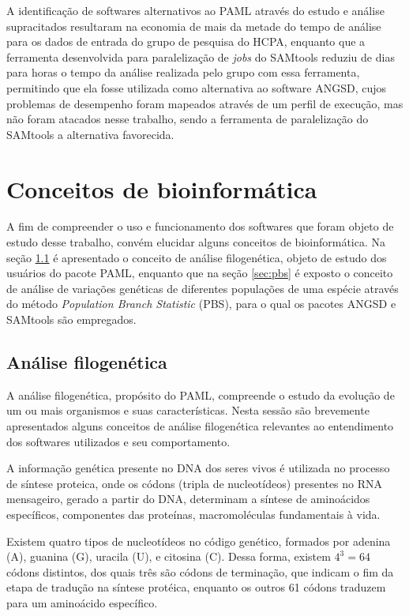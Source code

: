 \documentclass[cic,tc]{iiufrgs}
\begin{document}
A identificação de softwares alternativos ao PAML através do estudo e análise
supracitados resultaram na economia de mais da metade do tempo de análise para
os dados de entrada do grupo de pesquisa do HCPA, enquanto que a ferramenta
desenvolvida para paralelização de \textit{jobs} do SAMtools reduziu de dias
para horas o tempo da análise realizada pelo grupo com essa ferramenta,
permitindo que ela fosse utilizada como alternativa ao software ANGSD, cujos
problemas de desempenho foram mapeados através de um perfil de execução, mas
não foram atacados nesse trabalho, sendo a ferramenta de paralelização do
SAMtools a alternativa favorecida.

\section{Conceitos de bioinformática}

A fim de compreender o uso e funcionamento dos softwares que foram objeto de
estudo desse trabalho, convém elucidar alguns conceitos de bioinformática. Na
seção \ref{sec:filo} é apresentado o conceito de análise filogenética, objeto
de estudo dos usuários do pacote PAML, enquanto que na seção \ref{sec:pbs} é
exposto o conceito de análise de variações genéticas de diferentes populações
de uma espécie através do método \textit{Population Branch Statistic} (PBS),
para o qual os pacotes ANGSD e SAMtools são empregados.

\subsection{Análise filogenética}
\label{sec:filo}

A análise filogenética, propósito do PAML, compreende o estudo da evolução de
um ou mais organismos e suas características. Nesta sessão são brevemente
apresentados alguns conceitos de análise filogenética relevantes ao
entendimento dos softwares utilizados e seu comportamento.

A informação genética presente no DNA dos seres vivos é utilizada no processo
de síntese proteica, onde os códons (tripla de nucleotídeos) presentes no RNA
mensageiro, gerado a partir do DNA, determinam a síntese de aminoácidos
específicos, componentes das proteínas, macromoléculas fundamentais à vida.

Existem quatro tipos de nucleotídeos no código genético, formados por adenina
(A), guanina (G), uracila (U), e citosina (C). Dessa forma, existem $4^3 = 64$
códons distintos, dos quais três são códons de terminação, que indicam o fim da
etapa de tradução na síntese protéica, enquanto os outros 61 códons traduzem
para um aminoácido específico.
\end{document}
